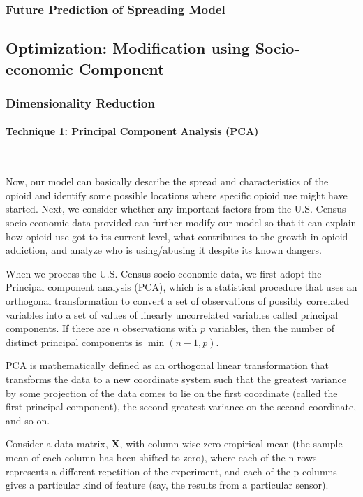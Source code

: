 \documentclass{mcmthesis}
\begin{document}
\subsubsection{Future Prediction of Spreading Model}





\subsection{Optimization: Modification using Socio-economic Component}\label{Sec:Optimazation}
\subsubsection{Dimensionality Reduction}

\paragraph{\textbf{Technique 1: Principal Component Analysis (PCA)}}

~\smallskip

Now, our model can basically describe the spread and characteristics of the opioid and identify some possible locations where specific opioid use might have started. Next, we consider whether any important factors from the U.S. Census socio-economic data provided can further modify our model so that it can explain how opioid use got to its current level, what contributes to the growth in opioid addiction, and analyze who is using/abusing it despite its known dangers.

When we process the U.S. Census socio-economic data, we first adopt  the Principal component analysis (PCA), which is a statistical procedure that uses an orthogonal transformation to convert a set of observations of possibly correlated variables into a set of values of linearly uncorrelated variables called principal components. If there are $n$ observations with $p$ variables, then the number of distinct principal components is $\min(n-1,p)$. 

PCA is mathematically defined as an orthogonal linear transformation that transforms the data to a new coordinate system such that the greatest variance by some projection of the data comes to lie on the first coordinate (called the first principal component), the second greatest variance on the second coordinate, and so on.

Consider a data matrix, $\mathbf{X}$, with column-wise zero empirical mean (the sample mean of each column has been shifted to zero), where each of the n rows represents a different repetition of the experiment, and each of the p columns gives a particular kind of feature (say, the results from a particular sensor).
\end{document}
